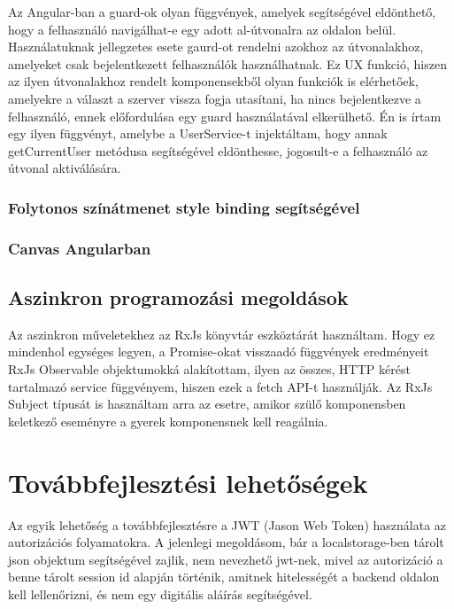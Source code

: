 \documentclass[a4paper,12pt]{report}
\theoremstyle{definition}
\theoremstyle{remark}
\begin{document}
Az Angular-ban a guard-ok olyan függvények, amelyek segítségével eldönthető, hogy a felhasználó navigálhat-e egy adott al-útvonalra az oldalon belül. Használatuknak jellegzetes esete gaurd-ot rendelni azokhoz az útvonalakhoz, amelyeket csak bejelentkezett felhasználók használhatnak. Ez UX funkció, hiszen az ilyen útvonalakhoz rendelt komponensekből olyan funkciók is elérhetőek, amelyekre a választ a szerver vissza fogja utasítani, ha nincs bejelentkezve a felhasználó, ennek előfordulása egy guard használatával elkerülhető. Én is írtam egy ilyen függvényt, amelybe a UserService-t injektáltam, hogy annak getCurrentUser metódusa segítségével eldönthesse, jogosult-e a felhasználó az útvonal aktiválására.

	\subsection{Folytonos színátmenet style binding segítségével}

	\subsection{Canvas Angularban}

\section{Aszinkron programozási megoldások}

Az aszinkron műveletekhez az RxJs könyvtár eszköztárát használtam. Hogy ez mindenhol egységes legyen, a Promise-okat visszaadó függvények eredményeit RxJs Observable objektumokká alakítottam, ilyen az összes, HTTP kérést tartalmazó service függvényem, hiszen ezek a fetch API-t használják. Az RxJs Subject típusát is használtam arra az esetre, amikor szülő komponensben keletkező eseményre a gyerek komponensnek kell reagálnia.
 
\chapter{Továbbfejlesztési lehetőségek}

Az egyik lehetőség a továbbfejlesztésre a JWT (Jason Web Token) használata az autorizációs folyamatokra. A jelenlegi megoldásom, bár a localstorage-ben tárolt json objektum segítségével zajlik, nem nevezhető jwt-nek, mivel az autorizáció a benne tárolt session id alapján történik, amitnek hitelességét a backend oldalon kell lellenőrizni, és nem egy digitális aláírás segítségével.
\end{document}
